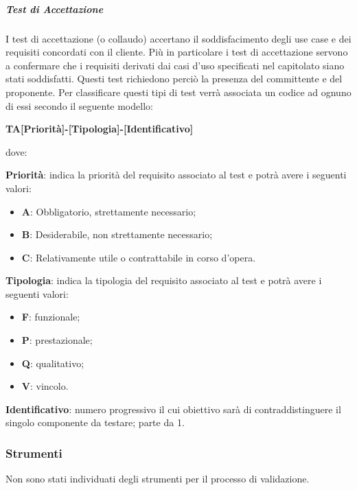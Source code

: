         \subparagraph*{Test di Accettazione}
            	I test di accettazione (o collaudo) accertano il soddisfacimento degli use case e dei requisiti concordati con il cliente.
                Più in particolare i test di accettazione servono a confermare che i requisiti derivati dai casi d'uso specificati nel capitolato siano stati soddisfatti. Questi test richiedono perciò la presenza del committente e del proponente.  
                Per classificare questi tipi di test verrà associata un codice ad ognuno di essi secondo il seguente modello:
                
                \begin{center}
                \textbf{TA[Priorità]-[Tipologia]-[Identificativo]}
                \end{center}
                dove: 
                
                \textbf{Priorità}: indica la priorità del requisito associato al test e potrà avere i seguenti valori:
                \begin{itemize}
                    \item \textbf{A}: Obbligatorio, strettamente necessario;
                    \item \textbf{B}: Desiderabile, non strettamente necessario;
                    \item \textbf{C}: Relativamente utile o contrattabile in corso d'opera. 
                 \end{itemize} 
                 \textbf{Tipologia}: indica la tipologia del requisito associato al test e potrà avere i seguenti valori:
                 \begin{itemize}
                    \item \textbf{F}: funzionale;
                    \item \textbf{P}: prestazionale;
                    \item \textbf{Q}: qualitativo;
                    \item \textbf{V}: vincolo.
                 \end{itemize}
                \textbf{Identificativo}: numero progressivo il cui obiettivo sarà di contraddistinguere il singolo componente da testare; parte da 1.
    \subsubsection{Strumenti}
        Non sono stati individuati degli strumenti per il processo di validazione.